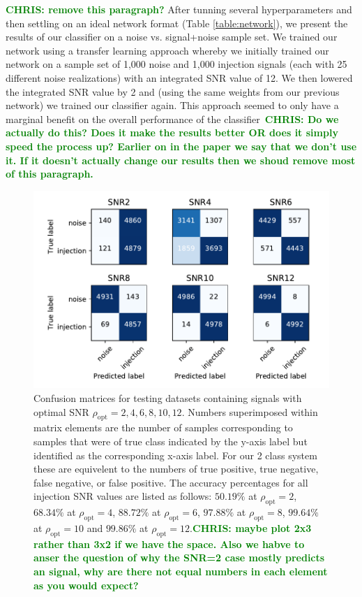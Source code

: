 \documentclass[%
 amsmath,amssymb,
 aps,
 twocolumn,
 prl,
 reprint,
floatfix,
]{revtex4-1}
\newcommand{\optsnr}{\rho_{\mathrm{opt}}}
\newcommand{\chris}[1]{\textbf{\textcolor{green}{CHRIS: #1}}}
\begin{document}
%
%
\chris{remove this paragraph?} After tunning several hyperparameters and then settling on
an ideal network format (Table \ref{table:network}), we present the results of
our classifier on a noise vs. signal+noise sample set. We trained our network
using a transfer learning approach whereby we initially trained our network on
a sample set of 1,000 noise and 1,000 injection signals (each with 25 different
noise realizations) with an integrated SNR value of 12. We then lowered the
integrated SNR value by 2 and (using the same weights from our previous
network) we trained our classifier again. This approach seemed to only have a
marginal benefit on the overall performance of the classifier~\chris{Do we
actually do this? Does it make the results better OR does it simply speed the
process up? Earlier on in the paper we say that we don't use it. If it doesn't
actually change our results then we shoud remove most of this paragraph.}  

%
%
\begin{figure}[]
\includegraphics[width=\columnwidth] {figures/confusion_matrix.pdf}
\caption{Confusion matrices for testing datasets containing signals with
optimal SNR $\rho_{\mathrm{opt}}=2,4,6,8,10,12$.  Numbers superimposed within
matrix elements are the number of samples corresponding to samples that were of
true class indicated by the y-axis label but identified as the corresponding
x-axis label. For our 2 class system these are equivelent to the numbers of
true positive, true negative, false negative, or false positive. The accuracy
percentages for all injection SNR values are listed as follows: $50.19\%$ at
$\optsnr=2$, $68.34\%$ at $\optsnr=4$, $88.72\%$ at $\optsnr=6$, $97.88\%$ at
$\optsnr=8$, $99.64\%$ at $\optsnr=10$ and $99.86\%$ at
$\optsnr=12$.\chris{maybe plot 2x3 rather than 3x2 if we have the space. Also
we habve to anser the question of why the SNR=2 case mostly predicts an signal,
why are there not equal numbers in each element as you would
expect?}\label{fig:confusion}}
\end{figure}
\end{document}
